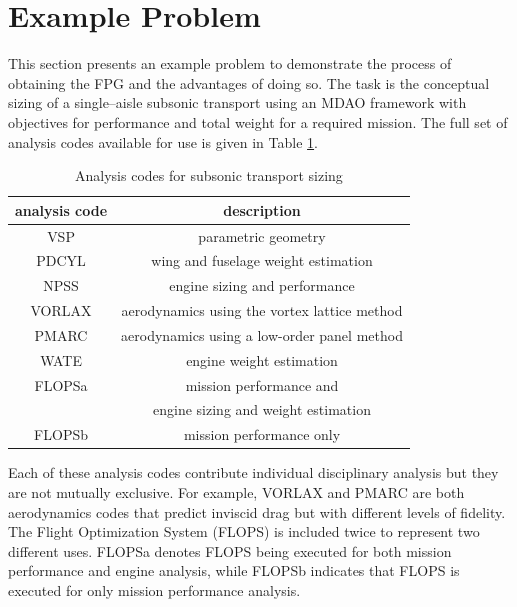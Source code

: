 \section{Example Problem}
This section presents an example problem to demonstrate the process of obtaining the FPG and the advantages of doing so. The task is the conceptual sizing of a single--aisle subsonic transport using an MDAO framework with objectives for performance and total weight for a required mission. The full set of analysis codes available for use is given in Table \ref{t:analysis codes}.
\begin{table}[htbp]
  \centering
  \caption{Analysis codes for subsonic transport sizing}
    \begin{tabular}{cc}
    \toprule
    analysis code & description \\
    \midrule
    VSP   & parametric geometry \\
    PDCYL & wing and fuselage weight estimation \\
    NPSS  & engine sizing and performance \\
    VORLAX & aerodynamics using the vortex lattice method \\
    PMARC & aerodynamics using a low-order panel method \\
    WATE  & engine weight estimation \\
    FLOPSa & mission performance and \\
      & engine sizing and weight estimation \\
    FLOPSb & mission performance only \\
    \bottomrule
    \end{tabular}%
  \label{t:analysis codes}%
\end{table}%
Each of these analysis codes contribute individual disciplinary analysis but they are not mutually exclusive. For example, VORLAX and PMARC are both aerodynamics codes that predict inviscid drag but with different levels of fidelity. The Flight Optimization System (FLOPS) is included twice to represent two different uses. FLOPSa denotes FLOPS being executed for both mission performance and engine analysis, while FLOPSb indicates that FLOPS is executed for only mission performance analysis.

